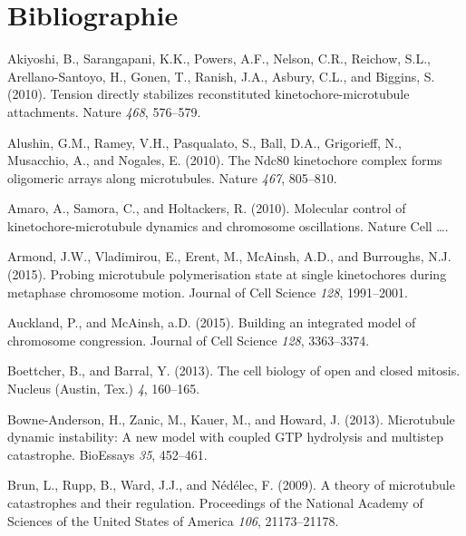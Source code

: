 \documentclass[12pt,a4paper,twoside,openright]{book}
\begin{document}
\backmatter

\chapter{Bibliographie}\label{bibliographie}



Akiyoshi, B., Sarangapani, K.K., Powers, A.F., Nelson, C.R., Reichow,
S.L., Arellano-Santoyo, H., Gonen, T., Ranish, J.A., Asbury, C.L., and
Biggins, S. (2010). Tension directly stabilizes reconstituted
kinetochore-microtubule attachments. Nature \emph{468}, 576--579.

Alushin, G.M., Ramey, V.H., Pasqualato, S., Ball, D.A., Grigorieff, N.,
Musacchio, A., and Nogales, E. (2010). The Ndc80 kinetochore complex
forms oligomeric arrays along microtubules. Nature \emph{467}, 805--810.

Amaro, A., Samora, C., and Holtackers, R. (2010). Molecular control of
kinetochore-microtubule dynamics and chromosome oscillations. Nature
Cell \ldots{}.

Armond, J.W., Vladimirou, E., Erent, M., McAinsh, A.D., and Burroughs,
N.J. (2015). Probing microtubule polymerisation state at single
kinetochores during metaphase chromosome motion. Journal of Cell Science
\emph{128}, 1991--2001.

Auckland, P., and McAinsh, a.D. (2015). Building an integrated model of
chromosome congression. Journal of Cell Science \emph{128}, 3363--3374.

Boettcher, B., and Barral, Y. (2013). The cell biology of open and
closed mitosis. Nucleus (Austin, Tex.) \emph{4}, 160--165.

Bowne-Anderson, H., Zanic, M., Kauer, M., and Howard, J. (2013).
Microtubule dynamic instability: A new model with coupled GTP hydrolysis
and multistep catastrophe. BioEssays \emph{35}, 452--461.

Brun, L., Rupp, B., Ward, J.J., and Nédélec, F. (2009). A theory of
microtubule catastrophes and their regulation. Proceedings of the
National Academy of Sciences of the United States of America \emph{106},
21173--21178.
\end{document}
